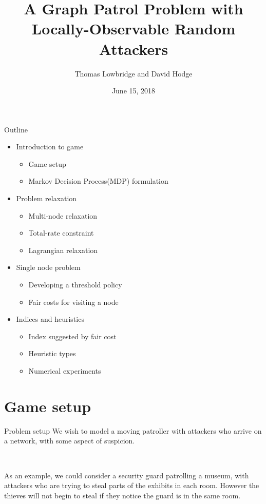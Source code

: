 \documentclass[10pt]{beamer}
\author{Thomas Lowbridge and David Hodge}
\title{A Graph Patrol Problem with Locally-Observable Random Attackers}
\institute{University Of Nottingham,UK}
\date{June 15, 2018}
\begin{document}
\hypertarget{Patrolling games}{}
\begin{frame}
\titlepage
\end{frame}


\begin{frame}{Outline}

\begin{itemize}
\item Introduction to game
\begin{itemize}
\item Game setup
\item Markov Decision Process(MDP) formulation
\end{itemize}
\item Problem relaxation
\begin{itemize}
\item Multi-node relaxation
\item Total-rate constraint
\item Lagrangian relaxation
\end{itemize}
\item Single node problem
\begin{itemize}
\item Developing a threshold policy
\item Fair costs for visiting a node
\end{itemize}
\item Indices and heuristics
\begin{itemize}
\item Index suggested by fair cost
\item Heuristic types
\item Numerical experiments
\end{itemize}
\end{itemize}
\end{frame}

\section{Game setup}
\begin{frame}{Problem setup}
We wish to model a moving patroller with attackers who arrive on a network, with some aspect of suspicion.

\

As an example, we could consider a security guard patrolling a museum, with attackers who are trying to steal parts of the exhibits in each room. However the thieves will not begin to steal if they notice the guard is in the same room.
\end{frame}
\end{document}
